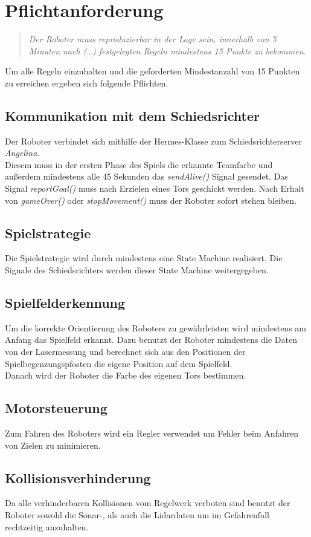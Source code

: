 \documentclass[12pt]{article}
\begin{document}
\section{Pflichtanforderung}
\begin{quote}
	\textit{Der Roboter muss reproduzierbar in der Lage sein, innerhalb von 5 Minuten nach (\ldots) festgelegten Regeln mindestens 15 Punkte zu bekommen.}
\end{quote}

Um alle Regeln einzuhalten und die geforderten Mindestanzahl von 15 Punkten zu erreichen ergeben sich folgende Pflichten.

\subsection{Kommunikation mit dem Schiedsrichter}
Der Roboter verbindet sich mithilfe der Hermes-Klasse zum Schiedsrichterserver \textit{Angelina}. \\
Diesem muss in der ersten Phase des Spiels die erkannte Teamfarbe und außerdem mindestens alle 45 Sekunden das \textit{sendAlive()} Signal gesendet. Das Signal \textit{reportGoal()} muss nach Erzielen eines Tors geschickt werden. Nach Erhalt von \textit{gameOver()} oder \textit{stopMovement()} muss der Roboter sofort stehen bleiben.

\subsection{Spielstrategie}
Die Spielstrategie wird durch mindestens eine State Machine realisiert. Die Signale des Schiedsrichters werden dieser State Machine weitergegeben.

\subsection{Spielfelderkennung}
Um die korrekte Orientierung des Roboters zu gewährleisten wird mindestens am Anfang das Spielfeld erkannt. Dazu benutzt der Roboter mindestens die Daten von der Lasermessung und berechnet sich aus den Positionen der Spielbegenzungspfosten die eigene Position auf dem Spielfeld.\\
Danach wird der Roboter die Farbe des eigenen Tors bestimmen.


\subsection{Motorsteuerung}
Zum Fahren des Roboters wird ein Regler verwendet um Fehler beim Anfahren von Zielen zu minimieren.

\subsection{Kollisionsverhinderung}
Da alle verhinderbaren Kollisionen vom Regelwerk verboten sind benutzt der Roboter sowohl die Sonar-, als auch die Lidardaten um im Gefahrenfall rechtzeitig anzuhalten.
\end{document}
